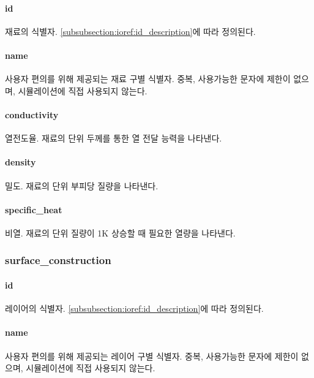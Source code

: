 \paragraph{id} 재료의 식별자. \ref{subsubsection:ioref:id_description}에 따라 정의된다.

\paragraph{name} 사용자 편의를 위해 제공되는 재료 구별 식별자. 중복, 사용가능한 문자에 제한이 없으며, 시뮬레이션에 직접 사용되지 않는다.

\paragraph{conductivity} 열전도율. 재료의 단위 두께를 통한 열 전달 능력을 나타낸다.

\paragraph{density} 밀도. 재료의 단위 부피당 질량을 나타낸다.

\paragraph{specific\_heat} 비열. 재료의 단위 질량이 1K 상승할 때 필요한 열량을 나타낸다.

\subsubsection{surface\_construction} \label{subsubsection:ioref:construction}

 
\paragraph{id} 레이어의 식별자. \ref{subsubsection:ioref:id_description}에 따라 정의된다.

\paragraph{name} 사용자 편의를 위해 제공되는 레이어 구별 식별자. 중복, 사용가능한 문자에 제한이 없으며, 시뮬레이션에 직접 사용되지 않는다.

